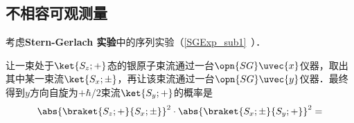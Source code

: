 \subsection{不相容可观测量}


考虑\textbf{Stern-Gerlach 实验}中的序列实验（\autoref{SGExp_sub1}~）．

让一束处于$\ket{S_z; +}$态的银原子束流通过一台$\opn{SG}\uvec{x}$仪器，取出其中某一束流$\ket{S_x; \pm}$，再让该束流通过一台$\opn{SG}\uvec{y}$仪器．最终得到$y$方向自旋为$+\hbar/2$束流$\ket{S_y; +}$的概率是
\begin{equation}
\abs{\braket{S_z; +}{S_x; \pm}}^2\cdot\abs{\braket{S_x; \pm}{S_y; +}}^2 = 
\end{equation}


























